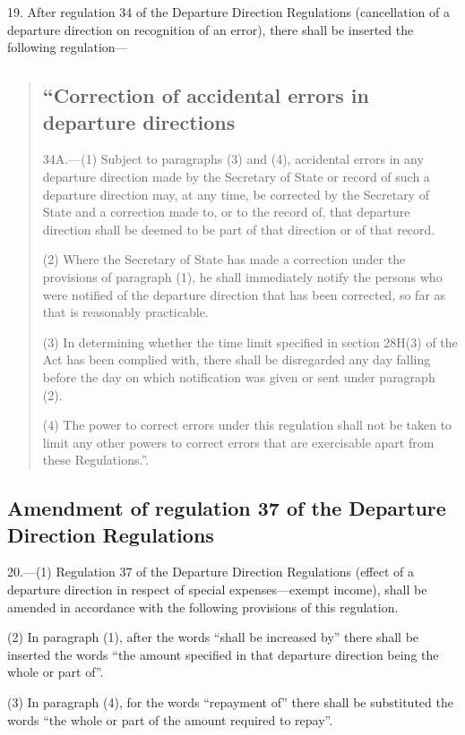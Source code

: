\documentclass[12pt,a4paper]{article}
\begin{document}
19.  After regulation 34 of the Departure Direction Regulations (cancellation of a departure direction on recognition of an error), there shall be inserted the following regulation—
\begin{quotation}
\subsection*{“Correction of accidental errors in departure directions}

34A.—(1) Subject to paragraphs (3) and (4), accidental errors in any departure direction made by the Secretary of State or record of such a departure direction may, at any time, be corrected by the Secretary of State and a correction made to, or to the record of, that departure direction shall be deemed to be part of that direction or of that record.

(2) Where the Secretary of State has made a correction under the provisions of paragraph (1), he shall immediately notify the persons who were notified of the departure direction that has been corrected, so far as that is reasonably practicable.

(3) In determining whether the time limit specified in section 28H(3) of the Act has been complied with, there shall be disregarded any day falling before the day on which notification was given or sent under paragraph (2).

(4) The power to correct errors under this regulation shall not be taken to limit any other powers to correct errors that are exercisable apart from these Regulations.”.
\end{quotation}

\subsection[20. Amendment of regulation 37 of the Departure Direction Regulations]{Amendment of regulation 37 of the Departure Direction Regulations}

20.—(1) Regulation 37 of the Departure Direction Regulations (effect of a departure direction in respect of special expenses—exempt income), shall be amended in accordance with the following provisions of this regulation.

(2) In paragraph (1), after the words “shall be increased by” there shall be inserted the words “the amount specified in that departure direction being the whole or part of”.

(3) In paragraph (4), for the words “repayment of” there shall be substituted the words “the whole or part of the amount required to repay”.
\end{document}
